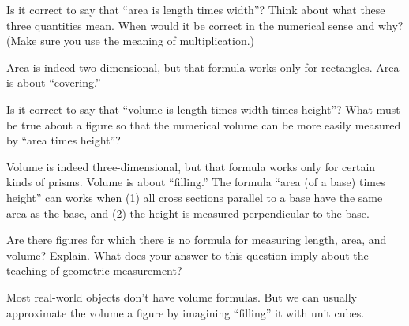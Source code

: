 \documentclass[nooutcomes]{ximera}
\begin{document}
\begin{problem}
Is it correct to say that ``area is length times width''?  Think about what these three quantities mean.  When would it be correct in the numerical sense and why?  (Make sure you use the meaning of multiplication.)   
\begin{freeResponse}
\end{freeResponse}
\begin{hint}
Area is indeed two-dimensional, but that formula works only for rectangles.  Area is about ``covering.''
\end{hint}
\end{problem}


\begin{problem}
 Is it correct to say that ``volume is length times width times height''? What must be true about a figure so that the numerical volume can be more easily measured by ``area times height''?
\begin{freeResponse}
\end{freeResponse}
\begin{hint}
Volume is indeed three-dimensional, but that formula works only for certain kinds of prisms.  Volume is about ``filling.''  The formula ``area (of a base) times height'' can works when (1) all cross sections parallel to a base have the same area as the base, and (2) the height is measured perpendicular to the base.   
\end{hint}
\end{problem}

\begin{problem}
Are there figures for which there is no formula for measuring length, area, and volume?  Explain.  What does your answer to this question imply about the teaching of geometric measurement?
\begin{freeResponse}
\end{freeResponse}
\begin{hint}
Most real-world objects don't have volume formulas.  But we can usually approximate the volume a figure by imagining ``filling'' it with unit cubes.  
\end{hint}
\end{problem}
\end{document}
